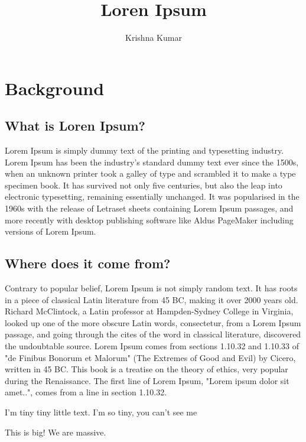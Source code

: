 \documentclass[11pt,times]{article}
\title{Loren Ipsum} %
\author{Krishna Kumar} %
\begin{document}
\maketitle

\section{Background} %
\subsection{What is Loren Ipsum?} %

Lorem Ipsum is simply dummy text of the printing and typesetting industry. 
Lorem Ipsum has been the industry's standard dummy text ever since the 1500s, 
when an unknown printer took a galley of type and scrambled it to make a type 
specimen book. It has survived not only five centuries, but also the leap into 
electronic typesetting, remaining essentially unchanged. It was popularised in 
the 1960s with the release of Letraset sheets containing Lorem Ipsum passages, 
and more recently with desktop publishing software like Aldus PageMaker 
including versions of Lorem Ipsum.


\subsection{Where does it come from?}  %

Contrary to popular belief, Lorem Ipsum is not simply random text. It has roots 
in a piece of classical Latin literature from 45 BC, making it over 2000 years 
old. Richard McClintock, a Latin professor at Hampden-Sydney College in 
Virginia, looked up one of the more obscure Latin words, consectetur, from a 
Lorem Ipsum passage, and going through the cites of the word in classical 
literature, discovered the undoubtable source. Lorem Ipsum comes from sections 
1.10.32 and 1.10.33 of "de Finibus Bonorum et Malorum" (The Extremes of Good 
and Evil) by Cicero, written in 45 BC. This book is a treatise on the theory of 
ethics, very popular during the Renaissance. The first line of Lorem Ipsum, 
"Lorem ipsum dolor sit amet..", comes from a line in section 1.10.32.



\tiny I'm tiny tiny little text. I'm so tiny, you can't see me

\Huge This is big! We are massive.
\end{document}
